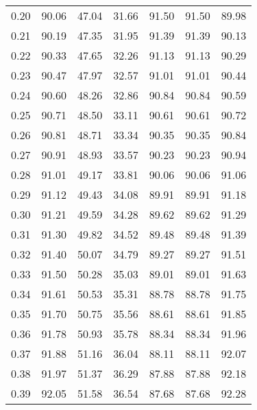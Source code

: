 \begin{tabular}{|c|c|c|c|c|c|c|}
      0.20 &     90.06 &     47.04 &      31.66 &   91.50 &      91.50 &         89.98 \\
      0.21 &     90.19 &     47.35 &      31.95 &   91.39 &      91.39 &         90.13 \\
      0.22 &     90.33 &     47.65 &      32.26 &   91.13 &      91.13 &         90.29 \\
      0.23 &     90.47 &     47.97 &      32.57 &   91.01 &      91.01 &         90.44 \\
      0.24 &     90.60 &     48.26 &      32.86 &   90.84 &      90.84 &         90.59 \\
      0.25 &     90.71 &     48.50 &      33.11 &   90.61 &      90.61 &         90.72 \\
      0.26 &     90.81 &     48.71 &      33.34 &   90.35 &      90.35 &         90.84 \\
      0.27 &     90.91 &     48.93 &      33.57 &   90.23 &      90.23 &         90.94 \\
      0.28 &     91.01 &     49.17 &      33.81 &   90.06 &      90.06 &         91.06 \\
      0.29 &     91.12 &     49.43 &      34.08 &   89.91 &      89.91 &         91.18 \\
      0.30 &     91.21 &     49.59 &      34.28 &   89.62 &      89.62 &         91.29 \\
      0.31 &     91.30 &     49.82 &      34.52 &   89.48 &      89.48 &         91.39 \\
      0.32 &     91.40 &     50.07 &      34.79 &   89.27 &      89.27 &         91.51 \\
      0.33 &     91.50 &     50.28 &      35.03 &   89.01 &      89.01 &         91.63 \\
      0.34 &     91.61 &     50.53 &      35.31 &   88.78 &      88.78 &         91.75 \\
      0.35 &     91.70 &     50.75 &      35.56 &   88.61 &      88.61 &         91.85 \\
      0.36 &     91.78 &     50.93 &      35.78 &   88.34 &      88.34 &         91.96 \\
      0.37 &     91.88 &     51.16 &      36.04 &   88.11 &      88.11 &         92.07 \\
      0.38 &     91.97 &     51.37 &      36.29 &   87.88 &      87.88 &         92.18 \\
      0.39 &     92.05 &     51.58 &      36.54 &   87.68 &      87.68 &         92.28 \\

\end{tabular}
